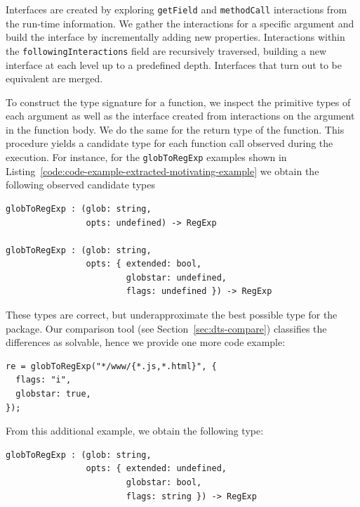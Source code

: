 \documentclass[sigplan,screen]{acmart}
\begin{document}
Interfaces are created by exploring \texttt{getField} and \texttt{methodCall} interactions from the run-time information. We
gather the interactions for a specific argument and build the
interface by incrementally adding new properties. Interactions within
the \texttt{followingInteractions} field are recursively traversed,
building a new interface at each level up to a predefined depth. Interfaces that turn out
to be equivalent are merged.

To construct the type signature for a function, we inspect the
primitive types of each argument as well as the interface created from
interactions on the argument in the function body. We do the same for
the return type of the function. This procedure yields a candidate
type for each function call observed during the execution.
For instance, for the \lstinline{globToRegExp} examples shown in
Listing~\ref{code:code-example-extracted-motivating-example} we obtain
the following observed candidate types
\begin{verbatim}
globToRegExp : (glob: string,
                opts: undefined) -> RegExp

globToRegExp : (glob: string, 
                opts: { extended: bool,
                        globstar: undefined,
                        flags: undefined }) -> RegExp
\end{verbatim}
These types are correct, but underapproximate the best possible type
for the package. Our comparison tool (see Section~\ref{sec:dts-compare}) classifies the differences as
solvable, hence we provide one more code example:
\begin{verbatim}
re = globToRegExp("*/www/{*.js,*.html}", {
  flags: "i",
  globstar: true,
});
\end{verbatim}
From this additional example, we obtain the following type:
\begin{verbatim}
globToRegExp : (glob: string, 
                opts: { extended: undefined,
                        globstar: bool,
                        flags: string }) -> RegExp
\end{verbatim}
\end{document}
